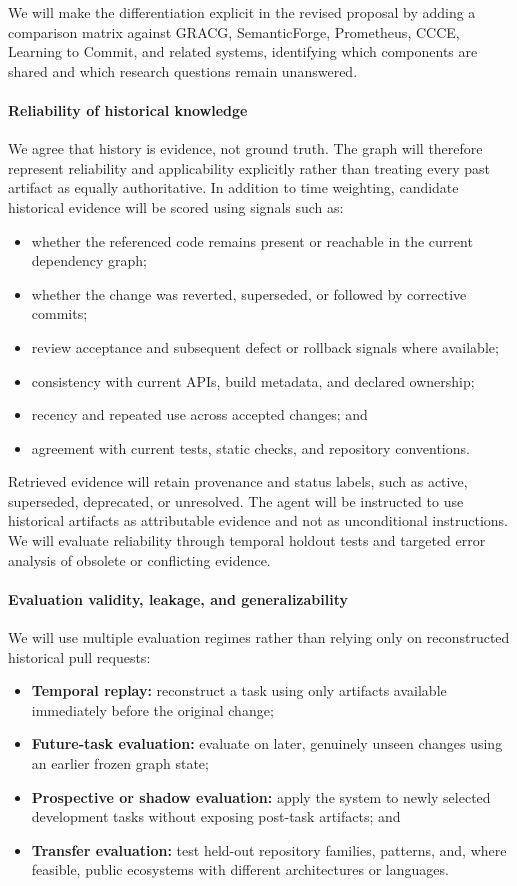 \documentclass[11pt]{article}
\begin{document}
We will make the differentiation explicit in the revised proposal by adding a comparison matrix against GRACG, SemanticForge, Prometheus, CCCE, Learning to Commit, and related systems, identifying which components are shared and which research questions remain unanswered.

\paragraph{Reliability of historical knowledge}
We agree that history is evidence, not ground truth. The graph will therefore represent reliability and applicability explicitly rather than treating every past artifact as equally authoritative. In addition to time weighting, candidate historical evidence will be scored using signals such as:

\begin{itemize}
  \item whether the referenced code remains present or reachable in the current dependency graph;
  \item whether the change was reverted, superseded, or followed by corrective commits;
  \item review acceptance and subsequent defect or rollback signals where available;
  \item consistency with current APIs, build metadata, and declared ownership;
  \item recency and repeated use across accepted changes; and
  \item agreement with current tests, static checks, and repository conventions.
\end{itemize}

Retrieved evidence will retain provenance and status labels, such as active, superseded, deprecated, or unresolved. The agent will be instructed to use historical artifacts as attributable evidence and not as unconditional instructions. We will evaluate reliability through temporal holdout tests and targeted error analysis of obsolete or conflicting evidence.

\paragraph{Evaluation validity, leakage, and generalizability}
We will use multiple evaluation regimes rather than relying only on reconstructed historical pull requests:

\begin{itemize}
  \item \textbf{Temporal replay:} reconstruct a task using only artifacts available immediately before the original change;
  \item \textbf{Future-task evaluation:} evaluate on later, genuinely unseen changes using an earlier frozen graph state;
  \item \textbf{Prospective or shadow evaluation:} apply the system to newly selected development tasks without exposing post-task artifacts; and
  \item \textbf{Transfer evaluation:} test held-out repository families, patterns, and, where feasible, public ecosystems with different architectures or languages.
\end{itemize}
\end{document}
